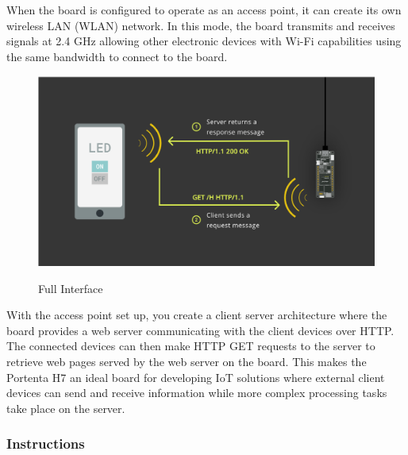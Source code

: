 When the board is configured to operate as an access point, it can create its own wireless LAN (WLAN) network. In this mode, the board transmits and receives signals at 2.4 GHz allowing other electronic devices with Wi-Fi capabilities using the same bandwidth to connect to the board.

\begin{figure}
	\begin{center}
		\includegraphics[width=0.7\linewidth]{Images/WIFI Module/Full Interface.png}
		\caption{Full Interface}
		\label{Full Interface} \cite{portentaWifiAccessPoint:2024}
	\end{center}
\end{figure}

With the access point set up, you create a client server architecture where the board provides a web server communicating with the client devices over HTTP. The connected devices can then make HTTP GET requests to the server to retrieve web pages served by the web server on the board. This makes the Portenta H7 an ideal board for developing IoT solutions where external client devices can send and receive information while more complex processing tasks take place on the server. \cite{portentaWifiAccessPoint:2024}

\subsubsection{Instructions}

